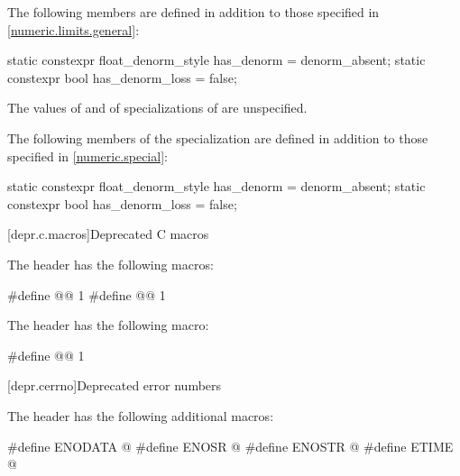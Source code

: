 \pnum
{}%
%
%
%
The following members are defined
in addition to those specified in \ref{numeric.limits.general}:
\begin{codeblock}
static constexpr float_denorm_style has_denorm = denorm_absent;
static constexpr bool has_denorm_loss = false;
\end{codeblock}

\pnum
The values of  and  of
specializations of  are unspecified.

\pnum
The following members of the specialization  are defined
in addition to those specified in \ref{numeric.special}:
%
%
\begin{codeblock}
static constexpr float_denorm_style has_denorm = denorm_absent;
static constexpr bool has_denorm_loss = false;
\end{codeblock}

[depr.c.macros]{Deprecated C macros}

\pnum
The header  has the following macros:
%
\begin{codeblock}
#define @@ 1
#define @@ 1
\end{codeblock}

\pnum
The header  has the following macro:
%
%
\begin{codeblock}
#define @@ 1
\end{codeblock}

[depr.cerrno]{Deprecated error numbers}

\pnum
The header  has the following additional macros:

%
%
%
%
\begin{codeblock}
#define ENODATA @\seebelow@
#define ENOSR @\seebelow@
#define ENOSTR @\seebelow@
#define ETIME @\seebelow@
\end{codeblock}

